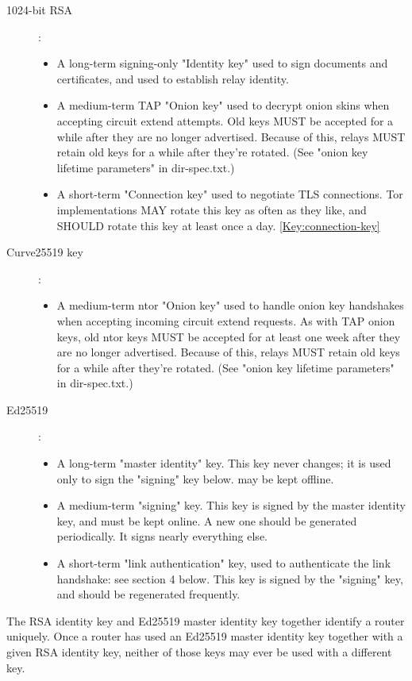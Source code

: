 \begin{description}
	\item [1024-bit RSA] :
	\begin{itemize}
		\item A long-term signing-only "Identity key" used to sign documents and certificates, and used to establish relay identity.
		\item A medium-term TAP "Onion key" used to decrypt onion skins when accepting circuit extend attempts.%
		Old keys MUST be accepted for a while after they are no longer advertised.  Because of this, relays MUST retain old keys for a while after they're rotated. (See "onion key lifetime parameters" in dir-spec.txt.) %
		\item A short-term "Connection key" used to negotiate TLS connections. Tor implementations MAY rotate this key as often as they like, and SHOULD rotate this key at least once a day. \ref{Key:connection-key}
	\end{itemize}
	\item [Curve25519 key] :
	\begin{itemize}
		\item A medium-term ntor "Onion key" used to handle onion key handshakes when accepting incoming circuit extend requests.  As with TAP onion keys, old ntor keys MUST be accepted for at least one week after they are no longer advertised.  Because of this, relays MUST retain old keys for a while after they're rotated. (See "onion key lifetime parameters" in dir-spec.txt.) %
	\end{itemize}
	\item [Ed25519] :
	\begin{itemize}
		\item A long-term "master identity" key.  This key never changes; it is used only to sign the "signing" key below. may be kept offline.
		\item A medium-term "signing" key.  This key is signed by the master identity key, and must be kept online.  A new one should be generated periodically.  It signs nearly everything else.
		\item A short-term "link authentication" key, used to authenticate the link handshake: see section 4 below.  This key is signed by the "signing" key, and should be regenerated frequently.%
	\end{itemize}
\end{description}

The RSA identity key and Ed25519 master identity key together identify a router uniquely.  Once a router has used an Ed25519 master identity key together with a given RSA identity key, neither of those keys may ever be used with a different key.

